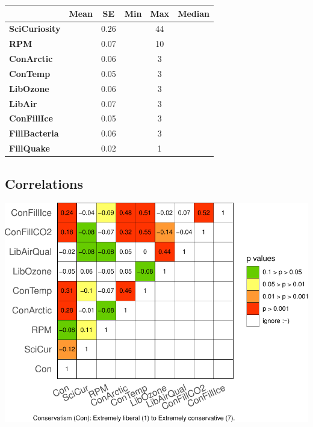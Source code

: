 \documentclass[
]{article}
\begin{document}
\begin{tabular}{>{}l||>{}c|c|>{}c|c|>{}c}
\hline
  & Mean & SE & Min & Max & Median\\
\hline
\textbf{SciCuriosity} & \cellcolor{lightgray}{24.73} & 0.26 & \cellcolor{lightgray}{9} & 44 & \cellcolor{lightgray}{25}\\
\hline
\textbf{RPM} & \cellcolor{lightgray}{5.64} & 0.07 & \cellcolor{lightgray}{1} & 10 & \cellcolor{lightgray}{6}\\
\hline
\textbf{ConArctic} & \cellcolor{lightgray}{-1.43} & 0.06 & \cellcolor{lightgray}{-3} & 3 & \cellcolor{lightgray}{-2}\\
\hline
\textbf{ConTemp} & \cellcolor{lightgray}{-1.69} & 0.05 & \cellcolor{lightgray}{-3} & 3 & \cellcolor{lightgray}{-2}\\
\hline
\textbf{LibOzone} & \cellcolor{lightgray}{-0.26} & 0.06 & \cellcolor{lightgray}{-3} & 3 & \cellcolor{lightgray}{-1}\\
\hline
\textbf{LibAir} & \cellcolor{lightgray}{-0.82} & 0.07 & \cellcolor{lightgray}{-3} & 3 & \cellcolor{lightgray}{-1}\\
\hline
\textbf{ConFillIce} & \cellcolor{lightgray}{-2.10} & 0.05 & \cellcolor{lightgray}{-3} & 3 & \cellcolor{lightgray}{-2}\\
\hline
\textbf{FillBacteria} & \cellcolor{lightgray}{-0.27} & 0.06 & \cellcolor{lightgray}{-3} & 3 & \cellcolor{lightgray}{0}\\
\hline
\textbf{FillQuake} & \cellcolor{lightgray}{0.31} & 0.02 & \cellcolor{lightgray}{0} & 1 & \cellcolor{lightgray}{0}\\
\hline
\end{tabular}

\hypertarget{correlations}{%
\subsection{Correlations}\label{correlations}}

\includegraphics{desc0829_files/figure-latex/cor-mat1-1.pdf}
\end{document}
